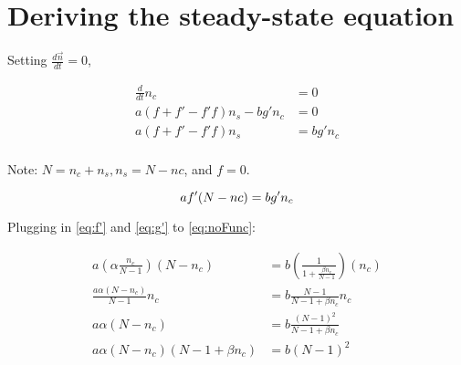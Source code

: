 \chapter{Deriving the steady-state equation}
\label{apndx:derivSS}
\hspace{\parindent} Setting $\frac{d\vec{n}}{dt} = 0$,

\begin{align}
\frac{d}{dt}n_{c} & = 0\\
a(f+f'-f'f)n_{s} - bg'n_{c} & = 0\\
a(f+f'-f'f)n_{s} & = bg'n_{c} \\
\end{align}

Note: $N = n_{c} + n_{s}, n_{s} = N - n{c}$, and $f = 0$.

\begin{equation}
af'(N - n{c}) = bg'n_{c} \\
\label{eq:noFunc}
\end{equation}

Plugging in \eqref{eq:f'} and \eqref{eq:g'} to \eqref{eq:noFunc}:

\begin{align}
a(\alpha\frac{n_{c}}{N-1})(N - n_{c}) &= b(\frac{1}{1 + \frac{\beta n_{c}}{N-1}})(n_{c}) \\
\frac{a\alpha (N - n_{c})}{N-1}n_{c} &= b\frac{N-1}{N-1+\beta n_{c}}n_{c} \\
a\alpha (N - n_{c}) &= b\frac{(N-1)^2}{N-1+\beta n_{c}} \\
a\alpha(N-n_{c})(N-1 + \beta n_{c}) & = b(N-1)^{2}
\end{align}